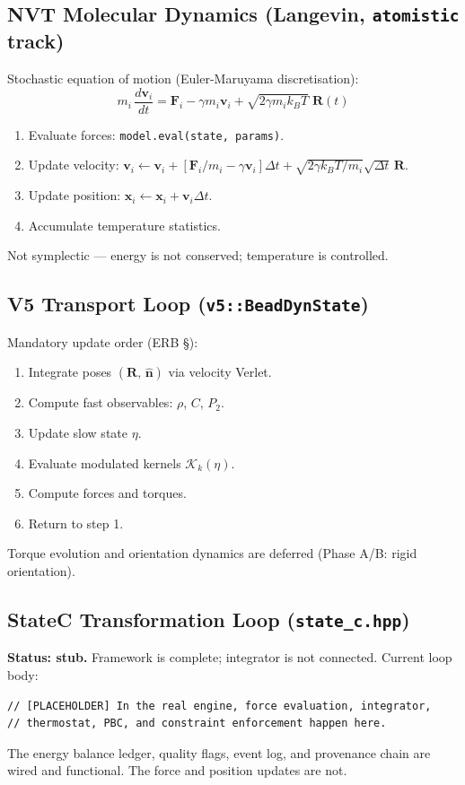 \documentclass[11pt,a4paper]{article}
\begin{document}
\subsection{NVT Molecular Dynamics (Langevin, \texttt{atomistic} track)}

Stochastic equation of motion (Euler-Maruyama discretisation):
\[
m_i\,\frac{d\mathbf{v}_i}{dt} = \mathbf{F}_i - \gamma m_i \mathbf{v}_i
  + \sqrt{2\gamma m_i k_B T}\;\mathbf{R}(t)
\]
\begin{enumerate}[label=\arabic*.]
  \item Evaluate forces: \texttt{model.eval(state, params)}.
  \item Update velocity: $\mathbf{v}_i \leftarrow \mathbf{v}_i + [\mathbf{F}_i/m_i - \gamma\mathbf{v}_i]\Delta t
        + \sqrt{2\gamma k_B T/m_i}\sqrt{\Delta t}\,\mathbf{R}$.
  \item Update position: $\mathbf{x}_i \leftarrow \mathbf{x}_i + \mathbf{v}_i \Delta t$.
  \item Accumulate temperature statistics.
\end{enumerate}
Not symplectic --- energy is not conserved; temperature is controlled.

\subsection{V5 Transport Loop (\texttt{v5::BeadDynState})}

Mandatory update order (ERB §):
\begin{enumerate}[label=\arabic*.]
  \item Integrate poses $(\mathbf{R},\, \hat{\mathbf{n}})$ via velocity Verlet.
  \item Compute fast observables: $\rho$, $C$, $P_2$.
  \item Update slow state $\eta$.
  \item Evaluate modulated kernels $\mathcal{K}_k(\eta)$.
  \item Compute forces and torques.
  \item Return to step 1.
\end{enumerate}
Torque evolution and orientation dynamics are deferred (Phase A/B: rigid orientation).

\subsection{StateC Transformation Loop (\texttt{state\_c.hpp})}

\textbf{Status: stub.} Framework is complete; integrator is not connected.
Current loop body:
\begin{lstlisting}
// [PLACEHOLDER] In the real engine, force evaluation, integrator,
// thermostat, PBC, and constraint enforcement happen here.
\end{lstlisting}
The energy balance ledger, quality flags, event log, and provenance
chain are wired and functional. The force and position updates are not.
\end{document}
